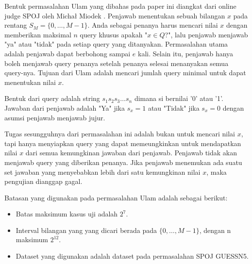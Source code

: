 \documentclass[conference,compsoc]{IEEEtran}
\begin{document}
Bentuk permasalahan Ulam yang dibahas pada paper ini diangkat dari online judge SPOJ oleh Micha\l{} Miodek \cite{guessn5}. Penjawab menentukan sebuah bilangan $x$ pada rentang $S_M=\{0,\ldots,M-1\}$. Anda sebagai penanya harus mencari nilai $x$ dengan memberikan maksimal $n$ query khusus apakah "$x \in Q$?", lalu penjawab menjawab "ya" atau "tidak" pada setiap query yang ditanyakan. Permasalahan utama adalah penjawab dapat berbohong sampai $e$ kali. Selain itu, penjawab hanya boleh menjawab query penanya setelah penanya selesai menanyakan semua query-nya. Tujuan dari Ulam adalah mencari jumlah query minimal untuk dapat menentukan nilai $x$.

Bentuk dari query adalah string $s_1s_2s_3\ldots s_n$ dimana si bernilai '0' atau '1'. Jawaban dari penjawab adalah "Ya" jika $s_x=1$ atau "Tidak" jika $s_x=0$ dengan asumsi penjawab menjawab jujur.

Tugas sesungguhnya dari permasalahan ini adalah bukan untuk mencari nilai $x$, tapi hanya menyiapkan query yang dapat memeungkinkan untuk mendapatkan nilai $x$ dari semua kemungkinan jawaban dari penjawab. Penjawab tidak akan menjawab query yang diberikan penanya. Jika penjawab menemukan ada suatu set jawaban yang menyebabkan lebih dari satu kemungkinan nilai $x$, maka pengujian dianggap gagal.

Batasan yang digunakan pada permasalahan Ulam adalah sebagai berikut:
\begin{itemize}
	\item Batas maksimum kasus uji adalah $2^7$.
	\item Interval bilangan yang yang dicari berada pada $\{0,\ldots,M-1\}$, dengan n maksimum $2^12$.
	\item Dataset yang digunakan adalah dataset pada permasalahan SPOJ GUESSN5.
\end{itemize}
\end{document}
